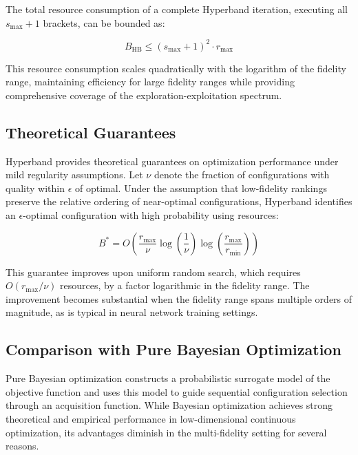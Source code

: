 The total resource consumption of a complete Hyperband iteration, executing all $s_{\max}+1$ brackets, can be bounded as:

\begin{equation}
B_{\text{HB}} \leq (s_{\max}+1)^2 \cdot r_{\max}
\label{eq:hb_budget}
\end{equation}

This resource consumption scales quadratically with the logarithm of the fidelity range, maintaining efficiency for large fidelity ranges while providing comprehensive coverage of the exploration-exploitation spectrum.

\subsection{Theoretical Guarantees}

Hyperband provides theoretical guarantees on optimization performance under mild regularity assumptions. Let $\nu$ denote the fraction of configurations with quality within $\epsilon$ of optimal. Under the assumption that low-fidelity rankings preserve the relative ordering of near-optimal configurations, Hyperband identifies an $\epsilon$-optimal configuration with high probability using resources:

\begin{equation}
B^* = O\left( \frac{r_{\max}}{\nu} \log\left(\frac{1}{\nu}\right) \log\left(\frac{r_{\max}}{r_{\min}}\right) \right)
\label{eq:hb_guarantee}
\end{equation}

This guarantee improves upon uniform random search, which requires $O(r_{\max}/\nu)$ resources, by a factor logarithmic in the fidelity range. The improvement becomes substantial when the fidelity range spans multiple orders of magnitude, as is typical in neural network training settings.

\subsection{Comparison with Pure Bayesian Optimization}

Pure Bayesian optimization constructs a probabilistic surrogate model of the objective function and uses this model to guide sequential configuration selection through an acquisition function. While Bayesian optimization achieves strong theoretical and empirical performance in low-dimensional continuous optimization, its advantages diminish in the multi-fidelity setting for several reasons.

